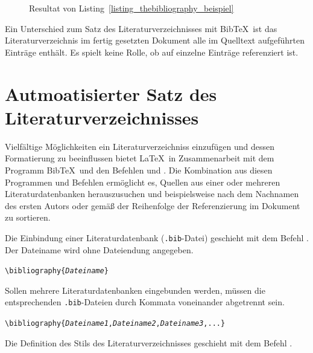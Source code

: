 \documentclass[a4paper,10pt,twoside]{scrbook}
\begin{document}
\begin{figure}[H]
	\caption{Resultat von Listing~\ref{listing_thebibliography_beispiel}}
	\label{fig_thebibliography_beispiel}
\end{figure}

Ein Unterschied zum Satz des Literaturverzeichnisses mit Bib\TeX\ ist das Literaturverzeichnis im fertig gesetzten Dokument alle im Quelltext aufgeführten Einträge enthält. Es spielt keine Rolle, ob auf einzelne Einträge referenziert ist.






\section{Autmoatisierter Satz des Literaturverzeichnisses}
\label{Abschnitt_bibtex}

Vielfältige Möglichkeiten ein Literaturverzeichniss einzufügen und dessen Formatierung zu beeinflussen bietet \LaTeX\ in Zusammenarbeit mit dem Programm Bib\TeX\ und den Befehlen \verb|| und \verb||. Die Kombination aus diesen Programmen und Befehlen ermöglicht es, Quellen aus einer oder mehreren Literaturdatenbanken herauszusuchen und beispielsweise nach dem Nachnamen des ersten Autors oder gemäß der Reihenfolge der Referenzierung im Dokument zu sortieren. 

Die Einbindung einer Literaturdatenbank (\verb|.bib|-Datei) geschieht mit dem Befehl \verb||. Der Dateiname wird ohne Dateiendung angegeben.

\begin{boxedminipage}{\textwidth}
	\texttt{\textbackslash bibliography\{\textsl{Dateiname}\}} 
\end{boxedminipage}

Sollen mehrere Literaturdatenbanken eingebunden werden, müssen die entsprechenden \verb|.bib|-Dateien durch Kommata voneinander abgetrennt sein.

\begin{boxedminipage}{\textwidth}
	\texttt{\textbackslash bibliography\{\textsl{Dateiname1},\textsl{Dateiname2},\textsl{Dateiname3},...\}} 
\end{boxedminipage}


Die Definition des Stils des Literaturverzeichnisses geschieht mit dem Befehl \verb||.
\end{document}

